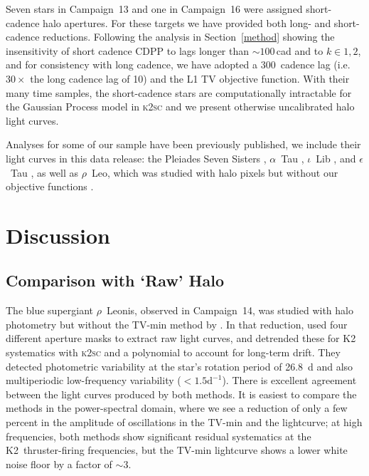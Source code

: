 \documentclass[modern]{aastex62}
\begin{document}
Seven stars in Campaign~13 and one in Campaign~16 were assigned short-cadence halo apertures. For these targets we have provided both long- and short-cadence reductions. Following the analysis in Section~\ref{method} showing the insensitivity of short cadence CDPP to lags longer than $\sim 100$\,cad and to $k \in {1,2}$, and for consistency with long cadence, we have adopted a 300~cadence lag (i.e. $30 \times$ the long cadence lag of 10) and the L1 TV objective function. With their many time samples, the short-cadence stars are computationally intractable for the Gaussian Process model in \textsc{k2sc} and we present otherwise uncalibrated halo light curves.



Analyses for some of our sample have been previously published, we include their light curves in this data release: the Pleiades Seven Sisters \citep{White2017}, $\alpha$~Tau \citep[Aldebaran;][]{Farr2018}, $\iota$~Lib \citep{Buysschaert2018}, and $\epsilon$~Tau \citep{Arentoft2019}, as well as $\rho$~Leo, which was studied with halo pixels but without our objective functions \citep{Aerts2018}.


\section{Discussion}
\label{sec:discussion}

\subsection{Comparison with `Raw' Halo}
\label{raw}

The blue supergiant $\rho$~Leonis, observed in Campaign~14, was studied with halo photometry but without the TV-min method by \citet{Aerts2018}. In that reduction, \citet{Aerts2018} used four different aperture masks to extract raw light curves, and detrended these for K2 systematics with \textsc{k2sc} and a polynomial to account for long-term drift. They detected photometric variability at the star's rotation period of 26.8~d and also multiperiodic low-frequency variability ($<1.5 \text{d}^{-1}$). There is excellent agreement between the light curves produced by both methods. It is easiest to compare the methods in the power-spectral domain, where we see a reduction of only a few percent in the amplitude of oscillations in the TV-min and the \citet{Aerts2018} lightcurve; at high frequencies, both methods show significant residual systematics at the K2~thruster-firing frequencies, but the TV-min lightcurve shows a lower white noise floor by a factor of $\sim 3$. 
\end{document}
